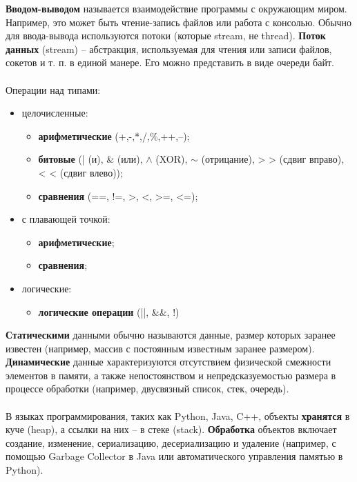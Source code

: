 \documentclass[a4paper, 12pt]{report}
\numberwithin{equation}{section}
\begin{document}
	\textbf{Вводом-выводом} называется взаимодействие программы с окружающим миром. Например, это может быть чтение-запись файлов или работа с консолью. Обычно для ввода-вывода используются потоки (которые stream, не thread). \textbf{Поток данных} (stream) – абстракция, используемая для чтения или записи файлов, сокетов и т. п. в единой манере. Его можно представить в виде очереди байт.
	\\\\
	Операции над типами: 
	\begin{itemize}
		\item целочисленные:
		\begin{itemize}
			\item \textbf{арифметические} (+,-,*,/,\%,++,--);
			\item \textbf{битовые} (| (и), \& (или), $\wedge$ (XOR), $\sim$ (отрицание), > > (сдвиг вправо), < < (сдвиг влево));
			\item \textbf{сравнения} (==, !=, >, <, >=, <=);
		\end{itemize}
		\item с плавающей точкой:
		\begin{itemize}
			\item \textbf{арифметические};
			\item \textbf{сравнения};
		\end{itemize}
		\item логические:
		\begin{itemize}
			\item \textbf{логические операции} (||, \&\&, !)
		\end{itemize}
	\end{itemize}
	\textbf{Статическими} данными обычно называются данные, размер которых заранее известен (например, массив с постоянным известным заранее размером). \textbf{Динамические} данные характеризуются отсутствием физической смежности элементов в памяти, а также непостоянством и непредсказуемостью размера в процессе обработки (например, двусвязный список, стек, очередь).
	\\\\
	В языках программирования, таких как Python, Java, C++, объекты \textbf{хранятся} в куче (heap), а ссылки на них -- в стеке (stack).
	\textbf{Обработка} объектов включает создание, изменение, сериализацию, десериализацию и удаление (например, с помощью Garbage Collector в Java или автоматического управления памятью в Python).
	\\\\
\end{document}
